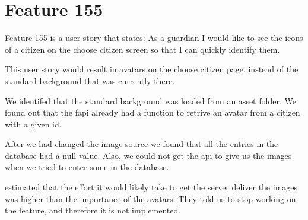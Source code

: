 \section{Feature 155}
Feature 155 is a user story that states: As a guardian I would like to see the icons of a citizen on the choose citizen screen so that I can quickly identify them. 

This user story would result in avatars on the choose citizen page, instead of the standard background that was currently there.

We identifed that the standard background was loaded from an asset folder. We found out that the \gls{fapi} already had a function to retrive an avatar from a citizen with a given id.

After we had changed the image source we found that all the entries in the database had a null value. Also, we could not get the \gls{api} to give us the images when we tried to enter some in the database.%

 estimated that the effort it would likely take to get the server deliver the images was higher than the importance of the avatars. They told us to stop working on the feature, and therefore it is not implemented. 